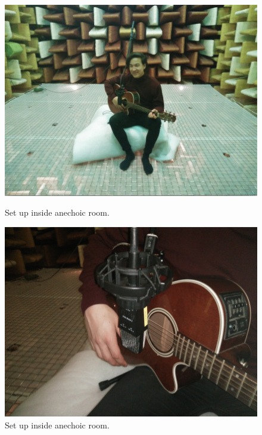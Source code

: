 \begin{figure}[H]
\centering
	\begin{minipage}{0.49\textwidth}
  	  
    		\includegraphics[scale=0.22]{figures/recording/setup1.png}
    		\caption{Set up inside anechoic room.}
    		\label{fig:setup1}
    \end{minipage}
    \begin{minipage}{0.49\textwidth}
  	  
    		\includegraphics[scale=0.22]{figures/recording/setup2.png}
    		\caption{Set up inside anechoic room.}
    		\label{fig:setup2}
    \end{minipage}
\end{figure} 

